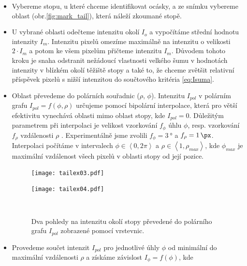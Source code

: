 	\begin{itemize}
	\item Vybereme stopu, u které chceme identifikovat ocásky, a ze snímku vybereme oblast (obr.\ref{fig:mark_tail}), která náleží zkoumané stopě. 
	
	\item U vybrané oblasti odečteme intenzitu okolí $I_o$ a vypočítáme střední hodnotu intenzity $I_m$. Intenzitu pixelů omezíme maximálně na intenzitu o velikosti $2\cdot I_m$ a potom ke všem pixelům přičteme intenzitu $I_m$. Důvodem tohoto kroku je snaha odstranit nežádoucí vlastnosti velkého šumu v hodnotách intenzity v blízkém okolí těžiště stopy a také to, že chceme zvětšit relativní příspěvek pixelů s nižší intenzitou do součtového kritéria \ref{eq:Isuma}.   
	
	\item Oblast převedeme do polárních souřadnic ($\rho$, $\phi$). Intenzitu $I_{pol}$ v polárním grafu $I_{pol} = f(\phi,\rho)$ určujeme pomocí bipolární interpolace, která pro větší efektivitu vynechává oblasti mimo oblast stopy, kde $I_{pol} = 0$. Důležitým parametrem při interpolaci je velikost vzorkování $f_{\phi}$ úhlu $\phi$, resp. vzorkování $f_{\rho}$ vzdálenosti $\rho$ . Experimentálně jsme zvolili $f_{\phi} = \SI{3}{\degree}$ a $f_{\rho} = \SI{1}{\px}$. Interpolaci počítáme v intervalech  $\phi \in \left\langle 0,2\pi \right\rangle$ a $\rho \in \left\langle 1,\rho_{max} \right\rangle$, kde $\phi_{max}$ je maximální vzdálenost všech pixelů v oblasti stopy od její pozice.  
	
	\begin{figure}[htps]
    \centering
    \begin{minipage}[c]{0.48\textwidth}
        \centering\texttt{[image: tailex03.pdf]}
    \end{minipage}
    \begin{minipage}[c]{0.48\textwidth}
        \centering\texttt{[image: tailex04.pdf]}
    \end{minipage}
    \\
        \caption[Detektor ocásků - polární graf.]{Dva pohledy na intenzitu okolí stopy převedené do polárního grafu $I_{pol}$ zobrazené pomocí vrstevnic.}
        \label{Detekce}
\end{figure}
	
	\item Provedeme součet intenzit $I_{pol}$ pro jednotlivé úhly $\phi$ od minimální do maximální vzdá\-le\-nos\-ti $\rho$ a získáme závislost $I_\phi = f(\phi)$, kde  
	

\end{itemize}
